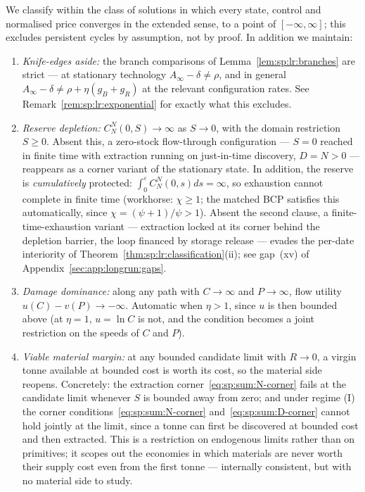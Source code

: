 \begin{assumption}\label{ass:sp:lr:regular}
We classify within the class of solutions in which every state, control and normalised price
converges in the extended sense, to a point of $\left[-\infty,\infty\right]$; this excludes
persistent cycles by assumption, not by proof. In addition we maintain:
\begin{enumerate}
    \item[(i)] \emph{Knife-edges aside:} the branch comparisons of
    Lemma~\ref{lem:sp:lr:branches} are strict --- at stationary technology
    $A_\infty-\delta\ne\rho$, and in general
    $A_\infty-\delta\ne\rho+\eta\left(g_B+g_R\right)$ at the relevant configuration rates. See
    Remark~\ref{rem:sp:lr:exponential} for exactly what this excludes.
    \item[(ii)] \emph{Reserve depletion:} $C^N_N\left(0,S\right)\to\infty$ as $S\to0$, with the
    domain restriction $S\ge0$. Absent this, a zero-stock flow-through configuration --- $S=0$
    reached in finite time with extraction running on just-in-time discovery, $D=N>0$ ---
    reappears as a corner variant of the stationary state. In addition, the reserve is
    \emph{cumulatively} protected: $\int_0^\varepsilon C^N_N\left(0,s\right)ds=\infty$, so
    exhaustion cannot complete in finite time (workhorse: $\chi\ge1$; the matched BCP
    satisfies this automatically, since $\chi=\left(\psi+1\right)/\psi>1$). Absent the second
    clause, a finite-time-exhaustion variant --- extraction locked at its corner behind the
    depletion barrier, the loop financed by storage release --- evades the per-date
    interiority of Theorem~\ref{thm:sp:lr:classification}(ii); see
    gap~(xv) of Appendix~\ref{sec:app:longrun:gaps}.
    \item[(iii)] \emph{Damage dominance:} along any path with $C\to\infty$ and $P\to\infty$,
    flow utility $u\left(C\right)-v\left(P\right)\to-\infty$. Automatic when $\eta>1$, since
    $u$ is then bounded above (at $\eta=1$, $u=\ln C$ is not, and the condition becomes a joint
    restriction on the speeds of $C$ and $P$).
    \item[(iv)] \emph{Viable material margin:} at any bounded candidate limit with $R\to0$, a
    virgin tonne available at bounded cost is worth its cost, so the material side reopens.
    Concretely: the extraction corner~\eqref{eq:sp:sum:N-corner} fails at the candidate limit
    whenever $S$ is bounded away from zero; and under regime (I) the corner
    conditions~\eqref{eq:sp:sum:N-corner} and~\eqref{eq:sp:sum:D-corner} cannot hold jointly
    at the limit, since a tonne can first be discovered at bounded cost and then extracted.
    This is a restriction on endogenous limits rather than on primitives; it scopes out the
    economies in which materials are never worth their supply cost even from the first tonne
    --- internally consistent, but with no material side to study.
\end{enumerate}
\end{assumption}

